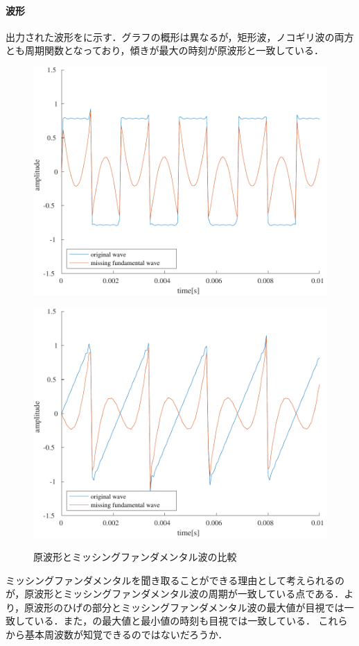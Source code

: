 \paragraph{波形}出力された波形をに示す．グラフの概形は異なるが，矩形波，ノコギリ波の両方とも周期関数となっており，傾きが最大の時刻が原波形と一致している．
\begin{figure}[h]
    \centering
    \begin{minipage}{.48\textwidth}
        \centering
        \includegraphics[keepaspectratio,width=\textwidth]{../../Figures/04_30_kukei.pdf}
        \label{fig:ミッシングファンダメンタル_矩形波}
    \end{minipage}
    \begin{minipage}{.48\textwidth}
        \centering
        \includegraphics[keepaspectratio,width=\textwidth]{../../Figures/04_31_nokogiri.pdf}
        \label{fig:ミッシングファンダメンタル_ノコギリ波}
    \end{minipage}
    \caption{原波形とミッシングファンダメンタル波の比較}
    \label{fig:原波形と基本周波数を除去した波形}
\end{figure}
\consideration
ミッシングファンダメンタルを聞き取ることができる理由として考えられるのが，原波形とミッシングファンダメンタル波の周期が一致している点である．より，原波形のひげの部分とミッシングファンダメンタル波の最大値が目視では一致している．また，の最大値と最小値の時刻も目視では一致している．
これらから基本周波数が知覚できるのではないだろうか．